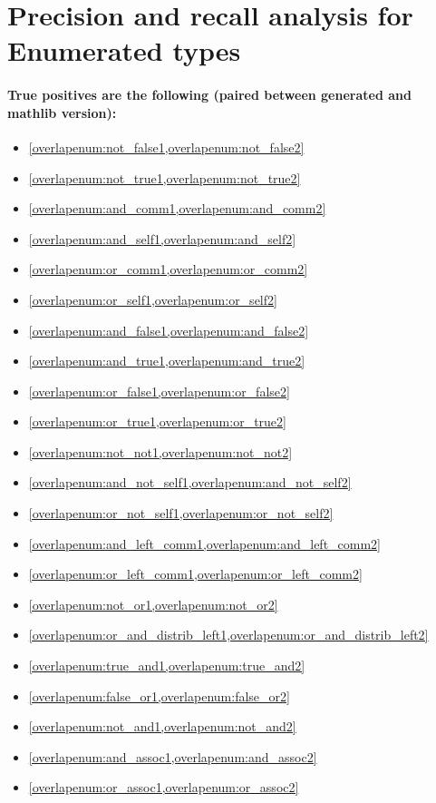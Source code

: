 \section{Precision and recall analysis for Enumerated types}\label{app:overlapenum}

\paragraph*{True positives are the following (paired between generated and mathlib version):}

\begin{multicols}{2}
\begin{itemize}[noitemsep]
    \item \cref{overlapenum:not_false1,overlapenum:not_false2}
    \item \cref{overlapenum:not_true1,overlapenum:not_true2}
    \item \cref{overlapenum:and_comm1,overlapenum:and_comm2}
    \item \cref{overlapenum:and_self1,overlapenum:and_self2}
    \item \cref{overlapenum:or_comm1,overlapenum:or_comm2}
    \item \cref{overlapenum:or_self1,overlapenum:or_self2}
    \item \cref{overlapenum:and_false1,overlapenum:and_false2}
    \item \cref{overlapenum:and_true1,overlapenum:and_true2}
    \item \cref{overlapenum:or_false1,overlapenum:or_false2}
    \item \cref{overlapenum:or_true1,overlapenum:or_true2}
    \item \cref{overlapenum:not_not1,overlapenum:not_not2}
    \item \cref{overlapenum:and_not_self1,overlapenum:and_not_self2}
    \item \cref{overlapenum:or_not_self1,overlapenum:or_not_self2}
    \item \cref{overlapenum:and_left_comm1,overlapenum:and_left_comm2}
    \item \cref{overlapenum:or_left_comm1,overlapenum:or_left_comm2}
    \item \cref{overlapenum:not_or1,overlapenum:not_or2}
    \item \cref{overlapenum:or_and_distrib_left1,overlapenum:or_and_distrib_left2}
    \item \cref{overlapenum:true_and1,overlapenum:true_and2}
    \item \cref{overlapenum:false_or1,overlapenum:false_or2}
    \item \cref{overlapenum:not_and1,overlapenum:not_and2}
    \item \cref{overlapenum:and_assoc1,overlapenum:and_assoc2}
    \item \cref{overlapenum:or_assoc1,overlapenum:or_assoc2}
\end{itemize}
\end{multicols}
\vspace{-0.2cm}

